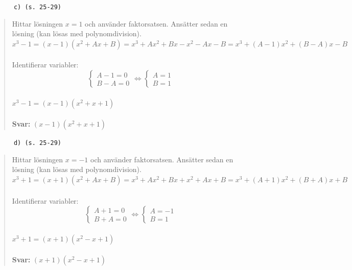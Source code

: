 \documentclass[a4paper]{article}
\newcommand{\tskcol}[1]{\textcolor{tskcol}{#1}}
\begin{document}
	\texttt{\tskcol{~~~~~~c) (s. 25-29)}}
	\begin{quotation}
		\noindent
		Hittar lösningen $x=1$ och använder faktorsatsen. Ansätter sedan en lösning (kan lösas med polynomdivision). \\
		$x^3-1=(x-1)(x^2+Ax+B)=x^3+Ax^2+Bx-x^2-Ax-B=x^3+(A-1)x^2+(B-A)x-B$ \\ \\
		Identifierar variabler: \\
		\[\begin{cases}
		A-1=0 \\
		B-A=0
		\end{cases}
		\Leftrightarrow
		\begin{cases}
		A=1 \\
		B=1
		\end{cases}\] \\
		$x^3-1=(x-1)(x^2+x+1)$
		\\ \\
		\textbf{Svar:} $(x-1)(x^2+x+1)$
	\end{quotation}
	
	\pagebreak
	\texttt{\tskcol{~~~~~~d) (s. 25-29)}}
	\begin{quotation}
		\noindent
		Hittar lösningen $x=-1$ och använder faktorsatsen. Ansätter sedan en lösning (kan lösas med polynomdivision). \\
		$x^3+1=(x+1)(x^2+Ax+B)=x^3+Ax^2+Bx+x^2+Ax+B=x^3+(A+1)x^2+(B+A)x+B$ \\ \\
		Identifierar variabler: \\
		\[\begin{cases}
		A+1=0 \\
		B+A=0
		\end{cases}
		\Leftrightarrow
		\begin{cases}
		A=-1 \\
		B=1
		\end{cases}\] \\
		$x^3+1=(x+1)(x^2-x+1)$
		\\ \\
		\textbf{Svar:} $(x+1)(x^2-x+1)$
	\end{quotation}
	
\end{document}
